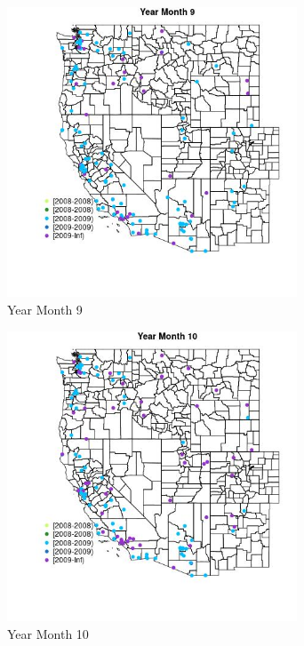 \begin{figure} 
\centering  
\includegraphics[width=0.77\textwidth]{Code_Outputs/Report_ML_input_PM25_Step4_part_e_de_duplicated_aves_MapObsMo9Year.jpg} 
\caption{\label{fig:Report_ML_input_PM25_Step4_part_e_de_duplicated_avesMapObsMo9Year}Year Month 9} 
\end{figure} 
 

\clearpage 

\begin{figure} 
\centering  
\includegraphics[width=0.77\textwidth]{Code_Outputs/Report_ML_input_PM25_Step4_part_e_de_duplicated_aves_MapObsMo10Year.jpg} 
\caption{\label{fig:Report_ML_input_PM25_Step4_part_e_de_duplicated_avesMapObsMo10Year}Year Month 10} 
\end{figure} 
 

